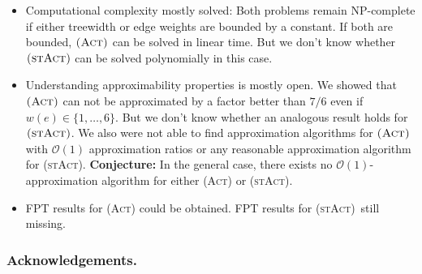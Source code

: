 \documentclass[runningheads]{llncs}
\numberwithin{equation}{section}
\newcommand{\set}[1]{\{ #1 \}}
\newcommand{\fromto}[2]{\set{#1, \ldots, #2}}
\newcommand{\comment}[1]{\textcolor{red}{(L: #1)}}
\newcommand{\bigO}{\mathcal{O}}
\newcommand{\act}{\textsc{(Act)}}
\newcommand{\stact}{\textsc{(stAct)}}
\DeclareMathOperator{\tw}{tw}
\begin{document}
\begin{itemize}
\item Computational complexity mostly solved: Both problems remain NP-complete if either treewidth or edge weights are bounded by a constant. If both are bounded, $\act$ can be solved in linear time. But we don't know whether $\stact$ can be solved polynomially in this case. 
\item Understanding approximability properties is mostly open. We showed that $\act$ can not be approximated by a factor better than $7/6$ even if $w(e) \in \fromto{1}{6}$. But we don't know whether an analogous result holds for $\stact$. We also were not able to find approximation algorithms for $\act$  with $\bigO(1)$ approximation ratios or any reasonable approximation algorithm for \stact. \textbf{Conjecture:} In the general case, there exists no $\bigO(1)$-approximation algorithm for either {\act} or \stact.
\item FPT results for {\act} could be obtained. FPT results for \stact\ still missing.
\end{itemize}


%

\subsubsection*{Acknowledgements.}
\end{document}
